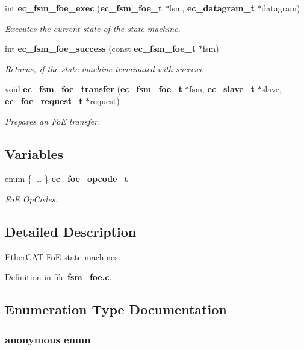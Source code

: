 \begin{DoxyCompactItemize}
int {\bf ec\-\_\-fsm\-\_\-foe\-\_\-exec} ({\bf ec\-\_\-fsm\-\_\-foe\-\_\-t} $\ast$fsm, {\bf ec\-\_\-datagram\-\_\-t} $\ast$datagram)
\begin{DoxyCompactList}\small\item\em Executes the current state of the state machine. \end{DoxyCompactList}\item 
int {\bf ec\-\_\-fsm\-\_\-foe\-\_\-success} (const {\bf ec\-\_\-fsm\-\_\-foe\-\_\-t} $\ast$fsm)
\begin{DoxyCompactList}\small\item\em Returns, if the state machine terminated with success. \end{DoxyCompactList}\item 
void {\bf ec\-\_\-fsm\-\_\-foe\-\_\-transfer} ({\bf ec\-\_\-fsm\-\_\-foe\-\_\-t} $\ast$fsm, {\bf ec\-\_\-slave\-\_\-t} $\ast$slave, {\bf ec\-\_\-foe\-\_\-request\-\_\-t} $\ast$request)
\begin{DoxyCompactList}\small\item\em Prepares an Fo\-E transfer. \end{DoxyCompactList}\end{DoxyCompactItemize}
\subsection*{Variables}
\begin{DoxyCompactItemize}
\item 
enum  \{ ... \}  {\bf ec\-\_\-foe\-\_\-opcode\-\_\-t}\label{fsm__foe_8c_ae1522d53c9b6fc891d7fc2e95440da60}

\begin{DoxyCompactList}\small\item\em Fo\-E Op\-Codes. \end{DoxyCompactList}\end{DoxyCompactItemize}


\subsection{Detailed Description}
Ether\-C\-A\-T Fo\-E state machines. 

Definition in file {\bf fsm\-\_\-foe.\-c}.



\subsection{Enumeration Type Documentation}
\subsubsection[{anonymous enum}]{\setlength{\rightskip}{0pt plus 5cm}anonymous enum}\label{fsm__foe_8c_a06fc87d81c62e9abb8790b6e5713c55b}


